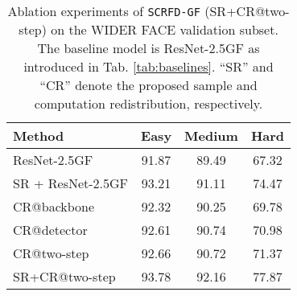 \documentclass[10pt,twocolumn,letterpaper]{article}
\newcommand{\dsname}[1]{\texttt{\small #1}\xspace}
\newcommand{\scrfdf}[1]{\dsname{SCRFD-\text{#1}GF}}
\begin{document}
\begin{table}[t!]
\small
\centering
\begin{tabular}{l|ccc}
\hline
Method  &Easy & Medium & Hard  \\
\hline\hline
ResNet-2.5GF     & 91.87  & 89.49 & 67.32  \\ 
SR + ResNet-2.5GF & 93.21 & 91.11 & 74.47   \\ 
\hline
CR@backbone &  92.32  & 90.25     &  69.78 \\
CR@detector &  92.61  & 90.74     &  70.98 \\
CR@two-step &  92.66  & 90.72     &  71.37 \\
SR+CR@two-step   &  93.78 & 92.16 & 77.87  \\
\hline
\end{tabular}
\hspace{1in}
\caption{Ablation experiments of \scrfdf{2.5} (\ie SR+CR@two-step) on the WIDER FACE validation subset. The baseline model is ResNet-2.5GF as introduced in Tab. \ref{tab:baselines}. ``SR'' and ``CR'' denote the proposed sample and computation redistribution, respectively.}
\label{tab:scrfd25g}
\vspace{-4mm}
\end{table}
\end{document}
